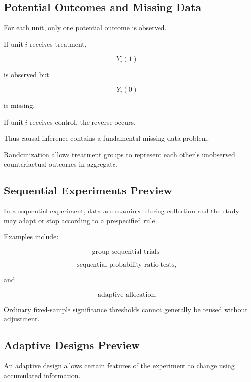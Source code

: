 \subsection{Potential Outcomes and Missing Data}
\label{subsec:potential-outcomes-missing}

For each unit, only one potential outcome is observed.

If unit \(i\) receives treatment,

\[
Y_i(1)
\]

is observed but

\[
Y_i(0)
\]

is missing.

If unit \(i\) receives control, the reverse occurs.

Thus causal inference contains a fundamental missing-data problem.

Randomization allows treatment groups to represent each other's
unobserved counterfactual outcomes in aggregate.

\subsection{Sequential Experiments Preview}
\label{subsec:sequential-experiments-preview}

In a sequential experiment, data are examined during collection and the
study may adapt or stop according to a prespecified rule.

Examples include:

\[
\boxed{
\text{group-sequential trials},
}
\]

\[
\boxed{
\text{sequential probability ratio tests},
}
\]

and

\[
\boxed{
\text{adaptive allocation}.
}
\]

Ordinary fixed-sample significance thresholds cannot generally be reused
without adjustment.

\subsection{Adaptive Designs Preview}
\label{subsec:adaptive-designs-preview}

An adaptive design allows certain features of the experiment to change
using accumulated information.

